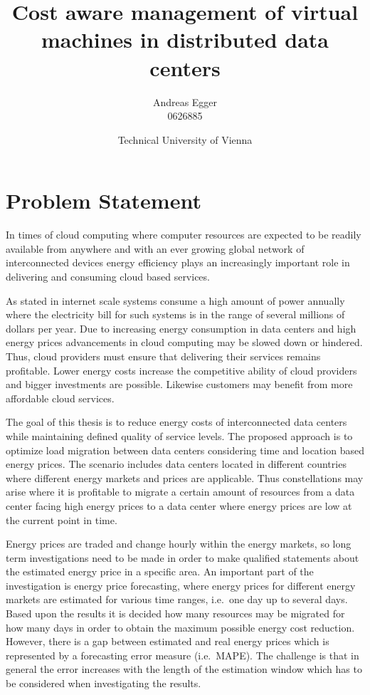 \documentclass[a4paper]{article}
\title{Cost aware management of virtual machines in distributed data centers}
\author{Andreas Egger \\0626885}
\date{Technical University of Vienna}
\begin{document}
\maketitle


\section{Problem Statement}

In times of cloud computing where computer resources are expected to be readily available from anywhere \cite{buyya2009cloud} and with an ever growing global network of interconnected devices energy efficiency plays an increasingly important role in delivering and consuming cloud based services. 

As stated in \cite{qureshi2009cutting} internet scale systems consume a high amount of power annually where the electricity bill for such systems is in the range of several millions of dollars per year. Due to increasing energy consumption in data centers and high energy prices advancements in cloud computing may be slowed down or hindered. Thus, cloud providers must ensure that delivering their services remains profitable. Lower energy costs increase the competitive ability of cloud providers and bigger investments are possible. Likewise customers may benefit from more affordable cloud services. 


The goal of this thesis is to reduce energy costs of interconnected data centers while maintaining defined quality of service levels. The proposed approach is to optimize load migration between data centers considering time and location based energy prices. The scenario includes data centers located in different countries where different energy markets and prices are applicable. Thus constellations may arise where it is profitable to migrate a certain amount of resources from a data center facing high energy prices to a data center where energy prices are low at the current point in time. 

Energy prices are traded and change hourly within the energy markets, so long term investigations need to be made in order to make qualified statements about the estimated energy price in a specific area.
An important part of the investigation is energy price forecasting, where energy prices for different energy markets are estimated for various time ranges, i.e.~one day up to several days. Based upon the results it is decided how many resources may be migrated for how many days in order to obtain the maximum possible energy cost reduction. However, there is a gap between estimated and real energy prices which is represented by a forecasting error measure (i.e.~MAPE). The challenge is that in general the error increases with the length of the estimation window which has to be considered when investigating the results. 
\end{document}

